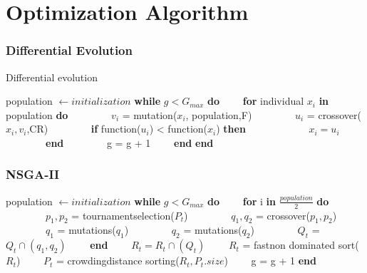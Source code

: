 \documentclass{beamer}
\begin{document}
	\section{Optimization Algorithm}
	\frame{\tableofcontents[currentsection]}

	\begin{frame}
	\frametitle{Differential Evolution}
	\begin{algorithm}[H]{Differential evolution}
		\begin{algorithmic}[1]
			\State population $\leftarrow initialization$
			\State \textbf{while} $g<G_{max}$ \textbf{do}
			\State \ \ \ \ \textbf{for} individual $x_{i}$ \textbf{in} population \textbf{do}
			\State \ \ \ \ \ \ \ \ $v_{i}$ = mutation($x_{i}$, population,F)
			\State \ \ \ \ \ \ \ \ $u_{i}$ = crossover($x_{i},v_{i}$,CR)
			\State \ \ \ \ \ \ \ \ \textbf{if} function($u_{i}$) < function($x_{i}$) \textbf{then}
			\State \ \ \ \ \ \ \ \ \ \ \ \ $x_{i} = u_{i}$
			\State \ \ \ \ \ \ \ \ \textbf{end}
			\State \ \ \ \ \ \ \ \ g = g + 1
			\State \ \ \ \ \textbf{end}
			\State \textbf{end}
		\end{algorithmic}
	\end{algorithm}
		
	\end{frame}

	\begin{frame}
	\frametitle{NSGA-II}
		\begin{algorithmic}[1]
			\State population $\leftarrow initialization$
			\State \textbf{while} $g<G_{max}$ \textbf{do}
			\State \ \ \ \ \textbf{for} i \textbf{in} $\frac{population}{2}$ \textbf{do}
			\State \ \ \ \ \ \ \ \ $p_{1},p_{2}$ = tournament\textunderscore selection($P_{t}$)
			\State \ \ \ \ \ \ \ \ $q_{1},q_{2}$ = crossover($p_{1},p_{2}$)
			\State \ \ \ \ \ \ \ \ $q_{1}$ = mutations($q_{1}$)
			\State \ \ \ \ \ \ \ \ $q_{2}$ = mutations($q_{2}$)
			\State \ \ \ \ \ \ \ \ $Q_{t}$ = $Q_{t} \cap (q_{1},q_{2})$
			\State \ \ \ \ \textbf{end}
			\State \ \ \ \ $R_{t} = R_{t} \cap (Q_{t})$
			\State \ \ \ \ $R_{t}$ = fast\textunderscore non \textunderscore dominated \textunderscore sort($R_{t}$)
			\State \ \ \ \ $P_{t}$ = crowding\textunderscore distance \textunderscore sorting($R_{t},P_{t}.size$)
			\State \ \ \ \ g = g + 1
			\State \textbf{end}
		\end{algorithmic}
	\end{frame}
\end{document}
